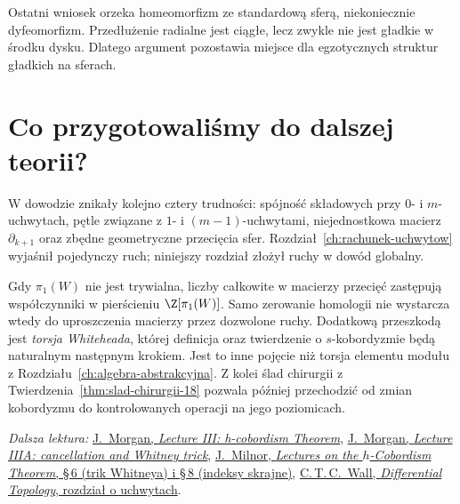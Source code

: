 \begin{uwaga}
Ostatni wniosek orzeka
homeomorfizm ze standardową
sferą, niekoniecznie
dyfeomorfizm. Przedłużenie
radialne jest ciągłe,
lecz zwykle nie jest
gładkie w środku dysku.
Dlatego argument pozostawia
miejsce dla egzotycznych
struktur gładkich
na sferach.
\end{uwaga}

\section{Co przygotowaliśmy do dalszej teorii?}
\label{sec:dalej-po-smale-19}

W dowodzie znikały kolejno
cztery trudności:
spójność składowych przy
$0$- i $m$-uchwytach,
pętle związane z
$1$- i $(m-1)$-uchwytami,
niejednostkowa macierz
$\partial_{k+1}$ oraz
zbędne geometryczne
przecięcia sfer.
Rozdział~\ref{ch:rachunek-uchwytow}
wyjaśnił pojedynczy ruch;
niniejszy rozdział złożył
ruchy w dowód globalny.

Gdy $\pi_1(W)$ nie jest
trywialna, liczby całkowite
w macierzy przecięć
zastępują współczynniki
w pierścieniu
$\Z[\pi_1(W)]$.
Samo zerowanie homologii
nie wystarcza wtedy
do uproszczenia macierzy
przez dozwolone ruchy.
Dodatkową przeszkodą
jest \emph{torsja Whiteheada},
której definicja oraz
twierdzenie o
$s$-kobordyzmie będą
naturalnym następnym
krokiem. Jest to inne
pojęcie niż torsja
elementu modułu
z Rozdziału~\ref{ch:algebra-abstrakcyjna}.
Z kolei ślad chirurgii
z Twierdzenia~\ref{thm:slad-chirurgii-18}
pozwala później
przechodzić od zmian
kobordyzmu do
kontrolowanych operacji
na jego poziomicach.

\par\smallskip
{\footnotesize\noindent\emph{Dalsza lektura:}
\href{https://www.math.columbia.edu/~jmorgan/Lecture_III_H-cobordism_Theorem.pdf}
{J.~Morgan, \emph{Lecture III: h-cobordism Theorem}},
\href{https://www.math.columbia.edu/~jmorgan/Lecture_IIIA_hcobordism_Contd.pdf}
{J.~Morgan, \emph{Lecture IIIA: cancellation and Whitney trick}},
\href{https://webhomes.maths.ed.ac.uk/~v1ranick/surgery/hcobord.pdf}
{J.~Milnor, \emph{Lectures on the $h$-Cobordism Theorem},
\S\,6 (trik Whitneya) i \S\,8 (indeksy skrajne)},
\href{https://www.cambridge.org/core/books/differential-topology/theory-of-handle-decompositions/BA54EF1BD9B755DFA2B363176B0CA2F7}
{C.\,T.\,C.~Wall, \emph{Differential Topology}, rozdział o uchwytach}.\par}
